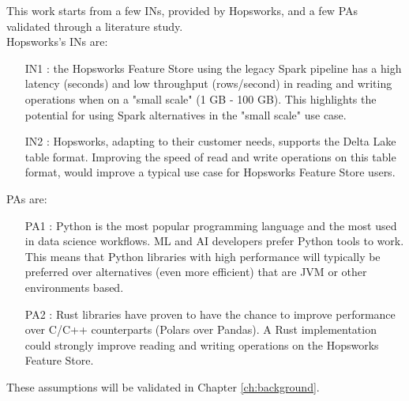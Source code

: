 This work starts from a few \glspl{IN}, provided by Hopsworks, and a few \glspl{PA} validated through a literature study. \\ Hopsworks's \glspl{IN} are:
\begin{itemize}
    \item[IN1 :] the Hopsworks Feature Store using the legacy Spark pipeline has a high latency (seconds) and low throughput (rows/second) in reading and writing operations when on a "small scale" (1 GB - 100 GB). This highlights the potential for using Spark alternatives in the "small scale" use case.
    \item[IN2 :] Hopsworks, adapting to their customer needs, supports the Delta Lake table format. Improving the speed of read and write operations on this table format, would improve a typical use case for Hopsworks Feature Store users.
\end{itemize}
\glspl{PA} are:
\begin{itemize}
    \item[PA1 :] Python is the most popular programming language and the most used in data science workflows. \gls{ML} and \gls{AI} developers prefer Python tools to work. This means that Python libraries with high performance will typically be preferred over alternatives (even more efficient) that are \gls{JVM} or other environments based.
    \item[PA2 :] Rust libraries have proven to have the chance to improve performance over C/C++ counterparts (Polars over Pandas). A Rust implementation could strongly improve reading and writing operations on the Hopsworks Feature Store.
\end{itemize}
These assumptions will be validated in Chapter \ref{ch:background}. 

